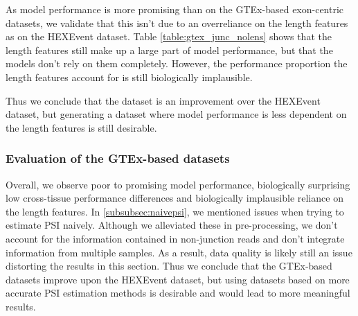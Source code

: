 \begin{table}[h!]
	\centering
	\caption{Performance on the GTEx-based intron-centric dataset with and without length features. 
	}
	\label{table:gtex_junc_nolens}
\end{table}

As model performance is more promising than on the GTEx-based exon-centric datasets, we validate that this isn't due to an overreliance on the length features as on the HEXEvent dataset. Table \ref{table:gtex_junc_nolens} shows that the length features still make up a large part of model performance, but that the models don't rely on them completely. However, the performance proportion the length features account for is still biologically implausible. 

Thus we conclude that the dataset is an improvement over the HEXEvent dataset, but generating a dataset where model performance is less dependent on the length features is still desirable. 




\subsubsection{Evaluation of the GTEx-based datasets}
Overall, we observe poor to promising model performance, biologically surprising low cross-tissue performance differences and biologically implausible reliance on the length features. 
In \ref{subsubsec:naivepsi}, we mentioned issues when trying to estimate PSI naively. Although we alleviated these in pre-processing, we don't account for the information contained in non-junction reads and don't integrate information from multiple samples. As a result, data quality is likely still an issue distorting the results in this section. 
Thus we conclude that the GTEx-based datasets improve upon the HEXEvent dataset, but using datasets based on more accurate PSI estimation methods is desirable and would lead to more meaningful results. %

